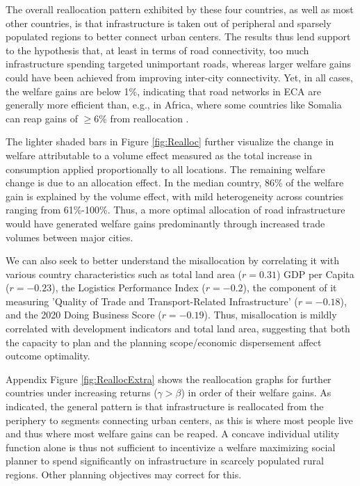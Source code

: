 \documentclass[a4paper]{article}
\begin{document}
The overall reallocation pattern exhibited by these four countries, as well as most other countries, is that infrastructure is taken out of peripheral and sparsely populated regions to better connect urban centers. The results thus lend support to the hypothesis that, at least in terms of road connectivity, too much infrastructure spending targeted unimportant roads, whereas larger welfare gains could have been achieved from improving inter-city connectivity. Yet, in all cases, the welfare gains are below 1\%, indicating that road networks in ECA are generally more efficient than, e.g., in Africa, where some countries like Somalia can reap gains of $\geq$6\% from reallocation \citep{graff2024spatial}. \newline 

 The lighter shaded bars in Figure \ref{fig:Realloc} further visualize the change in welfare attributable to a volume effect measured as the total increase in consumption applied proportionally to all locations. The remaining welfare change is due to an allocation effect. In the median country, 86\% of the welfare gain is explained by the volume effect, with mild heterogeneity across countries ranging from 61\%-100\%. Thus, a more optimal allocation of road infrastructure would have generated welfare gains predominantly through increased trade volumes between major cities.  \newline 
 
We can also seek to better understand the misallocation by correlating it with various country characteristics such as total land area ($r = 0.31$) GDP per Capita ($r = -0.23$), the Logistics Performance Index ($r = -0.2$), the component of it measuring 'Quality of Trade and Transport-Related Infrastructure' ($r = -0.18$), and the 2020 Doing Business Score ($r = -0.19$). Thus, misallocation is mildly correlated with development indicators and total land area, suggesting that both the capacity to plan and the planning scope/economic dispersement affect outcome optimality. \newline 

Appendix Figure \ref{fig:ReallocExtra} shows the reallocation graphs for further countries under increasing returns ($\gamma > \beta$) in order of their welfare gains. As indicated, the general pattern is that infrastructure is reallocated from the periphery to segments connecting urban centers, as this is where most people live and thus where most welfare gains can be reaped. A concave individual utility function alone is thus not sufficient to incentivize a welfare maximizing social planner to spend significantly on infrastructure in scarcely populated rural regions. Other planning objectives may correct for this. %
\end{document}
